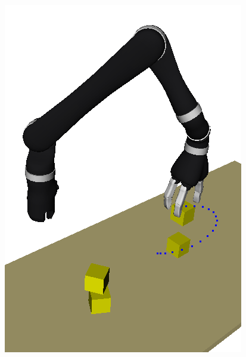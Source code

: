 \begin{frame}[fragile]
\begin{columns}
\begin{column}{0.4\textwidth}
    \includegraphics[width=\textwidth]{../thesis/img/openrave-blocks}
    \end{column}
  \end{columns}
    \pause
\end{frame}

